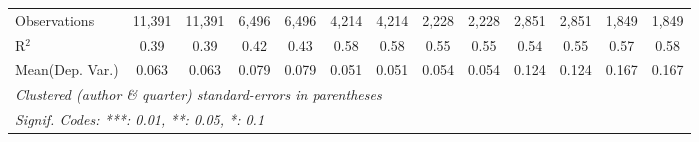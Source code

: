 \begin{tabular}{lcccccccccccc}
   Observations                             & 11,391        & 11,391         & 6,496         & 6,496         & 4,214   & 4,214    & 2,228   & 2,228    & 2,851         & 2,851         & 1,849        & 1,849\\  
   R$^2$                                    & 0.39          & 0.39           & 0.42          & 0.43          & 0.58    & 0.58     & 0.55    & 0.55     & 0.54          & 0.55          & 0.57         & 0.58\\  
Mean(Dep. Var.) & 0.063 & 0.063 & 0.079 & 0.079 & 0.051 & 0.051 & 0.054 & 0.054 & 0.124 & 0.124 & 0.167 & 0.167 \\
   \midrule \midrule
   \multicolumn{13}{l}{\emph{Clustered (author \& quarter) standard-errors in parentheses}}\\
   \multicolumn{13}{l}{\emph{Signif. Codes: ***: 0.01, **: 0.05, *: 0.1}}\\
\end{tabular}
\par\endgroup
